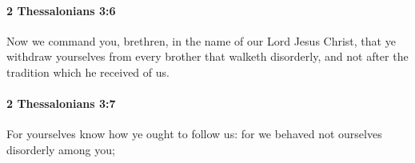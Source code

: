 		\paragraph{2 Thessalonians 3:6} %
			\label{2THESSALONIANS-3-6}

			Now we command you, brethren, in the name of our Lord Jesus Christ, that ye withdraw yourselves from every brother that walketh disorderly, and not after the tradition which he received of us.

			\begin{framed}
			\scriptsize
				\begin{compactdesc}
					\item[SBLG] 
				\end{compactdesc}
			\end{framed}

		\paragraph{2 Thessalonians 3:7} %
			\label{2THESSALONIANS-3-7}

			For yourselves know how ye ought to follow us: for we behaved not ourselves disorderly among you;

